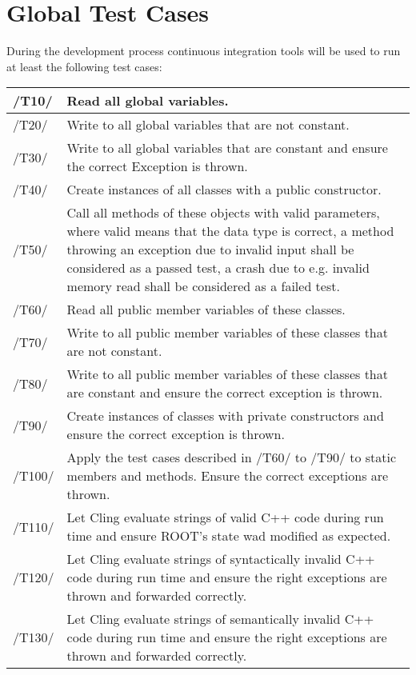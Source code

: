 \chapter{Global Test Cases}
During the development process continuous integration tools will be used to run at least the following test cases: \\

\begin{longtable}{|p{1cm} | p{15cm}|}
  \hline
  /T10/ & Read all global variables.\\
  \hline
  /T20/ & Write to all global variables that are not constant.\\
  \hline
  /T30/ & Write to all global variables that are constant and ensure the correct Exception is thrown.\\
  \hline
  /T40/ & Create instances of all classes with a public constructor.\\
  \hline
  /T50/ & Call all methods of these objects with valid parameters, where valid means that the data type is correct, a method throwing an exception due to invalid input shall be considered as a passed test, a crash due to e.g. invalid memory read shall be considered as a failed test.\\
  \hline
  /T60/ & Read all public member variables of these classes.\\
  \hline
  /T70/ & Write to all public member variables of these classes that are not constant.\\
  \hline
  /T80/ & Write to all public member variables of these classes that are constant and ensure the correct exception is thrown.\\
  \hline
  /T90/ & Create instances of classes with private constructors and ensure the correct exception is thrown.\\
  \hline
  /T100/ &  Apply the test cases described in /T60/ to /T90/ to static members and methods. Ensure the correct exceptions are thrown.\\
  \hline
  /T110/ & Let Cling evaluate strings of valid C++ code during run time and ensure ROOT's state wad modified as expected.\\
  \hline
  /T120/ & Let Cling evaluate strings of syntactically invalid C++ code during run time and ensure the right exceptions are thrown and forwarded correctly.\\
  \hline
  /T130/ & Let Cling evaluate strings of semantically invalid C++ code during run time and ensure the right exceptions are thrown and forwarded correctly.\\
  \hline
\end{longtable}
